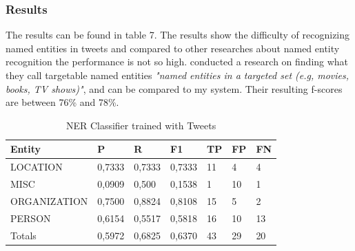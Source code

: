 \documentclass[
10pt, %
a4paper, %
oneside, %
headinclude,footinclude, %
BCOR5mm, %
]{scrartcl}
\begin{document}
\subsubsection{Results}
The results can be found in table 7. The results show the difficulty of recognizing named entities in tweets and compared to other researches about named entity recognition the performance is not so high. \cite{ashwini2014targetable} conducted a research on finding what they call targetable named entities \textit{"named entities in a targeted set (e.g, movies, books, TV shows)"}, and can be compared to my system. Their resulting f-scores are between 76\% and 78\%.
\begin{table}[h]
 \centering
\caption[NER Classifier trained with Tweets]{NER Classifier trained with Tweets }
\begin{tabular}{|l|l|l|l|l|l|l|}
\hline
Entity       & P      & R      & F1     & TP & FP & FN   \\ \hline
LOCATION     & 0,7333 & 0,7333 & 0,7333 & 11 & 4  & 4    \\ \hline
MISC         & 0,0909 & 0,500  & 0,1538 & 1  & 10 & 1    \\ \hline
ORGANIZATION & 0,7500 & 0,8824 & 0,8108 & 15 & 5  & 2    \\ \hline
PERSON       & 0,6154 & 0,5517 & 0,5818 & 16 & 10 & 13   \\ \hline
Totals       & 0,5972 & 0,6825 & 0,6370 & 43 & 29 & 20 \\ \hline
\end{tabular}

\end{table}


\clearpage
\newpage
\end{document}
